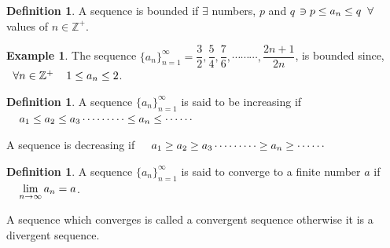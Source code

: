 \documentclass[11pt,a4paper]{article}
\theoremstyle{definition}
\newtheorem{defn}[thm]{Definition}
\newtheorem{exa}[thm]{Example}
\begin{document}
\begin{defn}


A sequence is bounded if $\exists$ numbers, $p$ and $q$ $\ni p \leq a_n \leq q \hspace{0.2cm}\forall$ values of $n\in \mathbb{Z}^+$.
\end{defn}


\begin{exa}


The sequence $\{a_n\}^{\infty}_{n=1} = \dfrac{3}{2}, \dfrac{5}{4},\dfrac{7}{6}, \cdots\cdots\cdots, \dfrac{2n+ 1}{2n}$, is bounded since, $\hspace{0.2cm} \forall n \in \mathbb{Z}^+\hspace{0.4cm} 1 \leq a_n \leq 2$.
\end{exa}


\begin{defn}


A sequence $\{a_n\}^{\infty}_{n=1}$ is said to be increasing if $\hspace{0.4cm} a_1\leq a_2\leq a_3\cdots\cdots\cdots \leq a_n \leq \cdots\cdots$


A sequence is decreasing if $\hspace{0.4cm} a_1\geq a_2\geq a_3\cdots\cdots\cdots \geq a_n \geq \cdots\cdots$
\end{defn}


\begin{defn}


A sequence $\{a_n\}^{\infty}_{n=1}$ is said to converge to a finite number $a$ if $\hspace{0.4cm} \lim\limits_{n\rightarrow \infty} a_n = a$.


A sequence which converges is called a convergent sequence otherwise it is a divergent sequence.
\end{defn}
\end{document}
